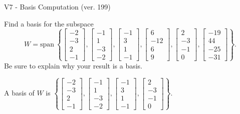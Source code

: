 \begin{exercise}
  \begin{exerciseTitle}V7 - Basis Computation (ver. 199)\end{exerciseTitle}
  \begin{exerciseStatement}
    Find a basis for the subspace 
\[W=\mathrm{span}\ \left\{\left[\begin{array}{r}
-2 \\
-3 \\
2 \\
-1
\end{array}\right] , \left[\begin{array}{r}
-1 \\
1 \\
-3 \\
-2
\end{array}\right] , \left[\begin{array}{r}
-1 \\
3 \\
1 \\
-1
\end{array}\right] , \left[\begin{array}{r}
6 \\
-12 \\
6 \\
9
\end{array}\right] , \left[\begin{array}{r}
2 \\
-3 \\
-1 \\
0
\end{array}\right] , \left[\begin{array}{r}
-19 \\
44 \\
-25 \\
-31
\end{array}\right]\right\}.\]
 Be sure to explain why your result is a basis.


  \end{exerciseStatement}
  \begin{exerciseAnswer}
   A basis of \(W\) is  \(\left\{\left[\begin{array}{r}
-2 \\
-3 \\
2 \\
-1
\end{array}\right] , \left[\begin{array}{r}
-1 \\
1 \\
-3 \\
-2
\end{array}\right] , \left[\begin{array}{r}
-1 \\
3 \\
1 \\
-1
\end{array}\right] , \left[\begin{array}{r}
2 \\
-3 \\
-1 \\
0
\end{array}\right]\right\}\).
  


  \end{exerciseAnswer}
\end{exercise}